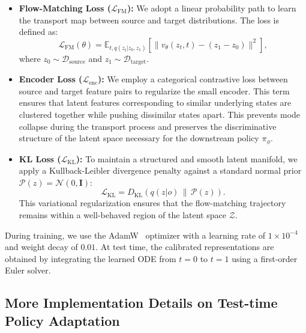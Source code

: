 \documentclass{article}
\begin{document}
\begin{itemize}
    \item \textbf{Flow-Matching Loss ($\mathcal{L}_{\mathrm{FM}}$):} We adopt a linear probability path to learn the transport map between source and target distributions. The loss is defined as:
    \begin{equation}
        \mathcal{L}_{\mathrm{FM}}(\theta) = \mathbb{E}_{t, q(z_t|z_0, z_1)} \left[ \| v_\theta(z_t, t) - (z_1 - z_0) \|^2 \right],
    \end{equation}
    where $z_0 \sim \mathcal{D}_{\mathrm{source}}$ and $z_1 \sim \mathcal{D}_{\mathrm{target}}$.
    
    \item \textbf{Encoder Loss ($\mathcal{L}_{\mathrm{enc}}$):} We employ a categorical contrastive loss between source and target feature pairs to regularize the small encoder. This term ensures that latent features corresponding to similar underlying states are clustered together while pushing dissimilar states apart. This prevents mode collapse during the transport process and preserves the discriminative structure of the latent space necessary for the downstream policy $\pi_\phi$.
    
    \item \textbf{KL Loss ($\mathcal{L}_{\mathrm{KL}}$):} To maintain a structured and smooth latent manifold, we apply a Kullback-Leibler divergence penalty against a standard normal prior $\mathcal{P}(z) = \mathcal{N}(0, \mathbf{I})$:
    \begin{equation}
        \mathcal{L}_{\mathrm{KL}} = D_{\mathrm{KL}}(q(z|o) \,\|\, \mathcal{P}(z)).
    \end{equation}
    This variational regularization ensures that the flow-matching trajectory remains within a well-behaved region of the latent space $\mathcal{Z}$.
\end{itemize}

During training, we use the AdamW~\cite{kingma2014adam} optimizer with a learning rate of $1 \times 10^{-4}$ and weight decay of $0.01$. At test time, the calibrated representations are obtained by integrating the learned ODE from $t=0$ to $t=1$ using a first-order Euler solver.


\subsection{More Implementation Details on Test-time Policy Adaptation}
\label{appendix:test-time-adaptation} 
\end{document}
